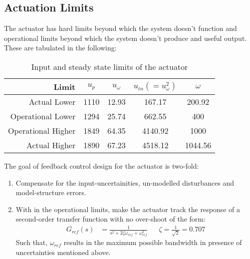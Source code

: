 \subsection{Actuation Limits}
The actuator has hard limits beyond which the system doesn't function and
operational limits beyond which the system doesn't produce and useful output.
These are tabulated in the following:
\begin{table}[H]
    \centering
    \begin{tabular}{r c c c c}
        \hline \hline
        Limit & $u_p$ & $u_{\omega}$ & $u_{in} (=u_\omega^2)$ & $\omega$ \\ \hline \hline
        Actual Lower         & 1110 & 12.93 & 167.17 & 200.92 \\
        Operational Lower    & 1294 & 25.74 &  662.55 & 400 \\
        Operational Higher   & 1849 & 64.35 & 4140.92 & 1000\\
        Actual Higher        & 1890 & 67.23 & 4518.12 &  1044.56\\
        \hline \hline
    \end{tabular}
    \caption{Input and steady state limits of the actuator}
\end{table}


\noindent The goal of feedback control design for the actuator is two-fold:
\begin{enumerate}
\item Compensate for the input-uncertainities, un-modelled disturbances and
model-structure errors.
\item With in the operational limits, make the actuator track the response of a second-order transfer function
with no over-shoot of the form:
\begin{align*}
    G_{ref}(s) &= \frac{1}{s^2 + 2 \zeta \omega_{ref} + \omega_{ref}^2}
    && \zeta = \frac{1}{\sqrt{2}} = 0.707
\end{align*}
Such that, $\omega_{ref}$ results in the maximum possible bandwidth in presence
of uncertainties mentioned above.
\end{enumerate}
